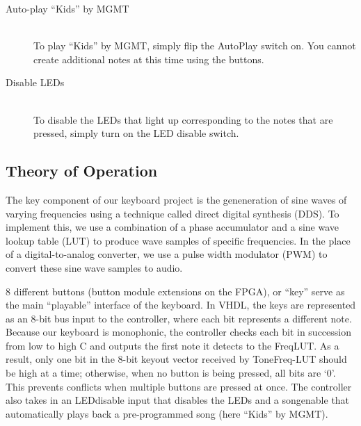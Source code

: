 \documentclass{article}
\begin{document}
\begin{description}
      \item[Auto-play ``Kids'' by MGMT] \hfill \\
        To play ``Kids'' by MGMT, simply flip the AutoPlay switch on. You cannot create additional notes at this time using the buttons.

      \item[Disable LEDs] \hfill \\
        To disable the LEDs that light up corresponding to the notes that are pressed, simply turn on the LED disable switch.
        
    \end{description}

  \subsection{Theory of Operation}
  

    The key component of our keyboard project is the geneneration of sine waves of varying frequencies using a technique called direct digital synthesis (DDS). To implement this, we use a combination of a phase accumulator and a sine wave lookup table (LUT) to produce wave samples of specific frequencies. In the place of a digital-to-analog converter, we use a pulse width modulator (PWM) to convert these sine wave samples to audio.

    8 different buttons (button module extensions on the FPGA), or ``key'' serve as the main ``playable'' interface of the keyboard. In VHDL, the keys are represented as an 8-bit bus input to the controller, where each bit represents a different note. Because our keyboard is monophonic, the controller checks each bit in succession from low to high C and outputs the first note it detects to the FreqLUT. As a result, only one bit in the 8-bit key\textunderscore out vector received by ToneFreq-LUT should be high at a time; otherwise, when no button is being pressed, all bits are `0'. This prevents conflicts when multiple buttons are pressed at once. The controller also takes in an LED\textunderscore disable input that disables the LEDs and a song\textunderscore enable that automatically plays back a pre-programmed song (here ``Kids'' by MGMT).
\end{document}
